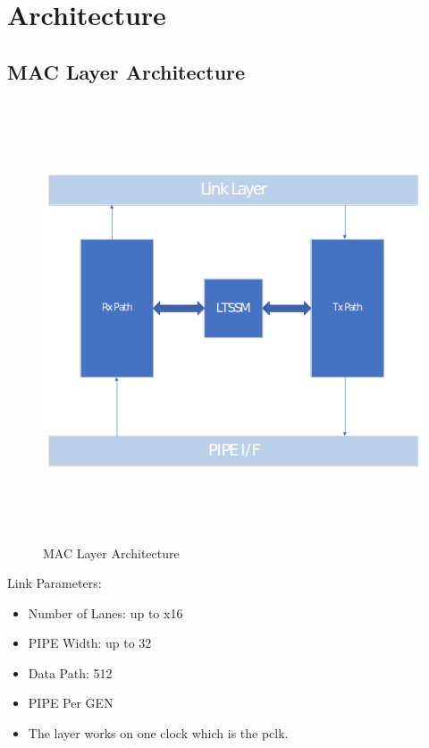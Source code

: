 \chapter{Architecture}
\label{4}
\section{MAC Layer Architecture}
\begin{figure}[H]
\centering
\includegraphics[width=130mm,height=130mm]{images/arch1.png}
\caption{MAC Layer Architecture}
  \label{fig:arch}
\end{figure}
Link Parameters:
  \begin{itemize}
    \item Number of Lanes: up to x16
    \item PIPE Width: up to 32
    \item Data Path: 512
    \item PIPE Per GEN
    \item The layer works on one clock which is the pclk.
  \end{itemize}
